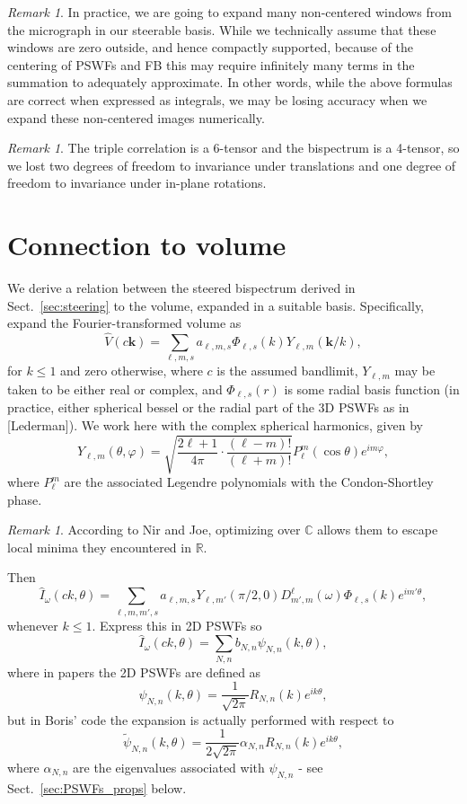 \documentclass{amsart}
\theoremstyle{definition}
\theoremstyle{remark}
\newtheorem{remark}[theorem]{Remark}
\numberwithin{equation}{section}
\newcommand{\kk}{\mathbf{k}}
\newcommand{\RR}{\mathbb{R}}
\begin{document}
\begin{remark}
In practice, we are going to expand many non-centered windows from the micrograph in our steerable basis. While we technically assume that these windows are zero outside, and hence compactly supported, because of the centering of PSWFs and FB this may require infinitely many terms in the summation to adequately approximate. In other words, while the above formulas are correct when expressed as integrals, we may be losing accuracy when we expand these non-centered images numerically.
\end{remark}

\begin{remark}
The triple correlation is a 6-tensor and the bispectrum is a 4-tensor, so we lost two degrees of freedom to invariance under translations and one degree of freedom to invariance under in-plane rotations.
\end{remark}

\section{Connection to volume}
We derive a relation between the steered bispectrum derived in Sect.~\ref{sec:steering} to the volume, expanded in a suitable basis. Specifically, expand the Fourier-transformed volume as
\[ \widehat V(c\kk) = \sum_{\ell,m,s}a_{\ell,m,s}\Phi_{\ell,s}(k)Y_{\ell,m}(\kk/k),\]
for $k\leq 1$ and zero otherwise, where $c$ is the assumed bandlimit, $Y_{\ell,m}$ may be taken to be either real or complex, and $\Phi_{\ell,s}(r)$ is some radial basis function (in practice, either spherical bessel or the radial part of the 3D PSWFs as in [Lederman]). We work here with the complex spherical harmonics, given by
\[ Y_{\ell,m}(\theta,\varphi) = \sqrt{\frac{2\ell+1}{4\pi}\cdot\frac{(\ell-m)!}{(\ell+m)!}}P_{\ell}^m(\cos\theta)e^{i m\varphi},\]
where $P_{\ell}^m$ are the associated Legendre polynomials with the Condon-Shortley phase. 
\begin{remark}
According to Nir and Joe, optimizing over $\mathbb{C}$ allows them to escape local minima they encountered in $\RR$.
\end{remark}

Then
\[ \widehat I_{\omega}(ck,\theta) = \sum_{\ell,m,m',s}a_{\ell,m,s}Y_{\ell,m'}(\pi/2,0)D_{m',m}^{\ell}(\omega)\Phi_{\ell,s}(k)e^{im'\theta},\]
whenever $k\leq 1$. Express this in 2D PSWFs so
\[ \widehat I_{\omega}(ck,\theta) = \sum_{N,n}b_{N,n}\psi_{N,n}(k,\theta),\]
where in papers the 2D PSWFs are defined as
\[ \psi_{N,n}(k,\theta) = \frac{1}{\sqrt{2\pi}}R_{N,n}(k)e^{ik\theta},\]
but in Boris' code the expansion is actually performed with respect to
\[ \widetilde\psi_{N,n}(k,\theta) = \frac{1}{2\sqrt{2\pi}}\alpha_{N,n}R_{N,n}(k)e^{ik\theta},\]
where $\alpha_{N,n}$ are the eigenvalues associated with $\psi_{N,n}$ - see Sect.~\ref{sec:PSWFs_props} below. 
\end{document}
